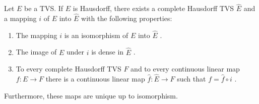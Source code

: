 \begin{thm}
	Let $ E $ be a TVS. If $ E $ is Hausdorff, there exists a complete Hausdorff TVS $ \widehat{ E } $ and a mapping $ i $ of $ E $ into $ \widehat{ E } $ with the following properties:

	\begin{enumerate}
		\item The mapping $ i $ is an isomorphism of $ E $ into $ \widehat{ E } $ .
		\item The image of $ E $ under $ i $ is dense in $ \widehat{ E } $ .
		\item To every complete Hausdorff TVS $ F $ and to every continuous linear map $ f:E \to F $ there is a continuous linear map $ \widehat{ f }: \widehat{ E } \to F $ such that $ f = \widehat{ f } \circ i $ .
	\end{enumerate}

	Furthermore, these maps are unique up to isomorphism.
\end{thm}

